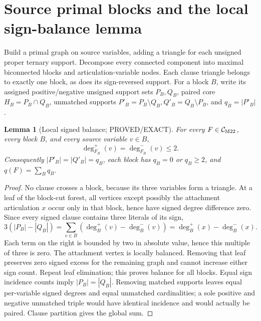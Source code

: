 \documentclass[11pt]{article}
\newtheorem{lemma}[theorem]{Lemma}
\begin{document}
\section{Source primal blocks and the local sign-balance lemma}
Build a primal graph on source variables, adding a triangle for each unsigned proper ternary support. Decompose every connected component into maximal biconnected blocks and articulation-variable nodes. Each clause triangle belongs to exactly one block, as does its sign-reversed support. For a block $B$, write its assigned positive/negative unsigned support sets $P_B,Q_B$, paired core $H_B=P_B\cap Q_B$, unmatched supports $P'_B=P_B\setminus Q_B,Q'_B=Q_B\setminus P_B$, and $q_B=|P'_B|$.

\begin{lemma}[Local signed balance; PROVED/EXACT]
For every $F\in\mathcal C_{\rm M22}$, every block $B$, and every source variable $v\in B$,
\[
\deg^+_{F_B}(v)=\deg^-_{F_B}(v)\le2.
\]
Consequently $|P'_B|=|Q'_B|=q_B$, each block has $q_B=0$ or $q_B\ge2$, and $q(F)=\sum_Bq_B$.
\end{lemma}
\begin{proof}
No clause crosses a block, because its three variables form a triangle. At a leaf of the block-cut forest, all vertices except possibly the attachment articulation $x$ occur only in that block, hence have signed degree difference zero. Since every signed clause contains three literals of its sign,
\[
3(|P_B|-|Q_B|)=\sum_{v\in B}(\deg^+_B(v)-\deg^-_B(v))
=\deg^+_B(x)-\deg^-_B(x).
\]
Each term on the right is bounded by two in absolute value, hence this multiple of three is zero. The attachment vertex is locally balanced. Removing that leaf preserves zero signed excess for the remaining graph and cannot increase either sign count. Repeat leaf elimination; this proves balance for all blocks. Equal sign incidence counts imply $|P_B|=|Q_B|$. Removing matched supports leaves equal per-variable signed degrees and equal unmatched cardinalities; a sole positive and negative unmatched triple would have identical incidence and would actually be paired. Clause partition gives the global sum.
\end{proof}
\end{document}
